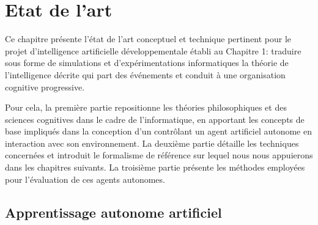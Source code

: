 \chapter{Etat de l'art}
\label{chap:etat}

\noindent
Ce chapitre présente l'état de l'art conceptuel et technique pertinent pour le projet d'intelligence artificielle développementale établi au Chapitre 1: 
traduire sous forme de simulations et d'expérimentations informatiques la théorie de l'intelligence décrite qui part des événements et conduit à une organisation cognitive progressive. 

Pour cela, la première partie repositionne les théories philosophiques et des sciences cognitives dans le cadre de l'informatique, en apportant les concepts de base impliqués dans la conception d'un  contrôlant un agent artificiel autonome en interaction avec son environnement. 
La deuxième partie détaille les techniques concernées et introduit le formalisme de référence sur lequel nous nous appuierons dans les chapitres suivants. 
La troisième partie présente les méthodes employées pour l'évaluation de ces agents autonomes.








\section{Apprentissage autonome artificiel}

